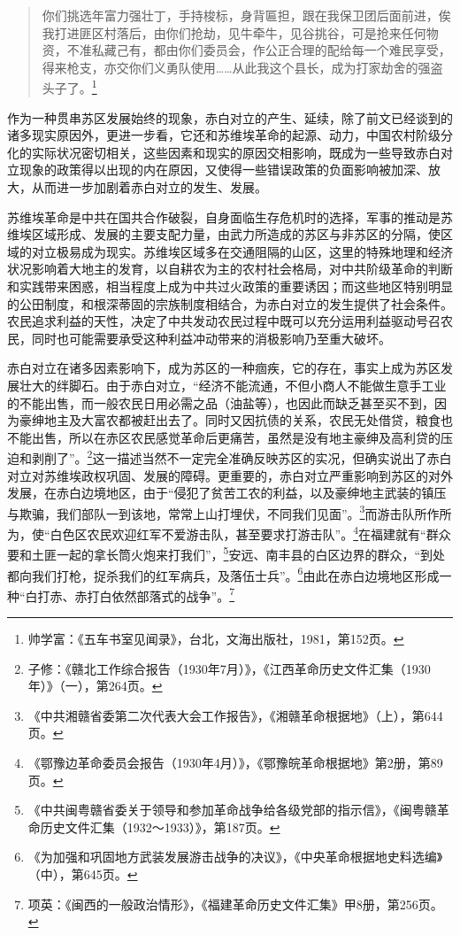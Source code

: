 \begin{quote}

你们挑选年富力强壮丁，手持梭标，身背匾担，跟在我保卫团后面前进，俟我打进匪区村落后，由你们抢劫，见牛牵牛，见谷挑谷，可是抢来任何物资，不准私藏己有，都由你们委员会，作公正合理的配给每一个难民享受，得来枪支，亦交你们义勇队使用……从此我这个县长，成为打家劫舍的强盗头子了。\footnote{帅学富：《五车书室见闻录》，台北，文海出版社，1981，第152页。}
\end{quote}


作为一种贯串苏区发展始终的现象，赤白对立的产生、延续，除了前文已经谈到的诸多现实原因外，更进一步看，它还和苏维埃革命的起源、动力，中国农村阶级分化的实际状况密切相关，这些因素和现实的原因交相影响，既成为一些导致赤白对立现象的政策得以出现的内在原因，又使得一些错误政策的负面影响被加深、放大，从而进一步加剧着赤白对立的发生、发展。


苏维埃革命是中共在国共合作破裂，自身面临生存危机时的选择，军事的推动是苏维埃区域形成、发展的主要支配力量，由武力所造成的苏区与非苏区的分隔，使区域的对立极易成为现实。苏维埃区域多在交通阻隔的山区，这里的特殊地理和经济状况影响着大地主的发育，以自耕农为主的农村社会格局，对中共阶级革命的判断和实践带来困惑，相当程度上成为中共过火政策的重要诱因；而这些地区特别明显的公田制度，和根深蒂固的宗族制度相结合，为赤白对立的发生提供了社会条件。农民追求利益的天性，决定了中共发动农民过程中既可以充分运用利益驱动号召农民，同时也可能需要承受这种利益冲动带来的消极影响乃至重大破坏。


赤白对立在诸多因素影响下，成为苏区的一种痼疾，它的存在，事实上成为苏区发展壮大的绊脚石。由于赤白对立，“经济不能流通，不但小商人不能做生意手工业的不能出售，而一般农民日用必需之品（油盐等），也因此而缺乏甚至买不到，因为豪绅地主及大富农都被赶出去了。同时又因抗债的关系，农民无处借贷，粮食也不能出售，所以在赤区农民感觉革命后更痛苦，虽然是没有地主豪绅及高利贷的压迫和剥削了”。\footnote{子修：《赣北工作综合报告（1930年7月）》，《江西革命历史文件汇集（1930年）》（一），第264页。}这一描述当然不一定完全准确反映苏区的实况，但确实说出了赤白对立对苏维埃政权巩固、发展的障碍。更重要的，赤白对立严重影响到苏区的对外发展，在赤白边境地区，由于“侵犯了贫苦工农的利益，以及豪绅地主武装的镇压与欺骗，我们部队一到该地，常常上山打埋伏，不同我们见面”。\footnote{《中共湘赣省委第二次代表大会工作报告》，《湘赣革命根据地》（上），第644页。}而游击队所作所为，使“白色区农民欢迎红军不爱游击队，甚至要求打游击队”。\footnote{《鄂豫边革命委员会报告（1930年4月）》，《鄂豫皖革命根据地》第2册，第89页。}在福建就有“群众要和土匪一起的拿长筒火炮来打我们”，\footnote{《中共闽粤赣省委关于领导和参加革命战争给各级党部的指示信》，《闽粤赣革命历史文件汇集（1932～1933）》，第187页。}安远、南丰县的白区边界的群众，“到处都向我们打枪，捉杀我们的红军病兵，及落伍士兵”。\footnote{《为加强和巩固地方武装发展游击战争的决议》，《中央革命根据地史料选编》（中），第645页。}由此在赤白边境地区形成一种“白打赤、赤打白依然部落式的战争”。\footnote{项英：《闽西的一般政治情形》，《福建革命历史文件汇集》甲8册，第256页。}


